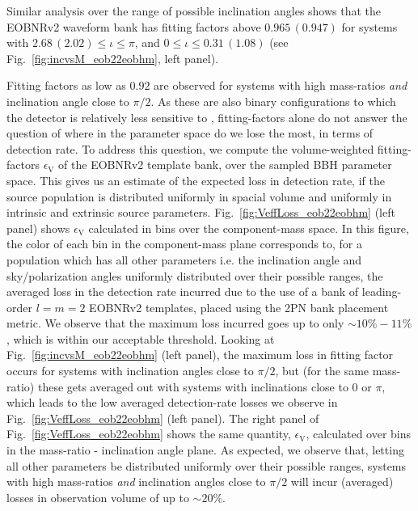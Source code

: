Similar analysis over the range of possible inclination angles shows that the EOBNRv2 
waveform bank has fitting factors above $0.965\, (0.947)$ for systems with
$2.68\,(2.02)\leq \iota \leq \pi$, and $0\leq \iota \leq 0.31\,(1.08)$ (see 
Fig.~\ref{fig:incvsM_eob22eobhm}, left panel). 


Fitting factors as low as $0.92$ are observed for systems with high mass-ratios 
\textit{and} inclination angle close to $\pi/2$. As these are also binary 
configurations to which the detector is relatively less sensitive to \citep{Pekowsky:2012sr}, 
fitting-factors alone do not answer the question of where in the parameter 
space do we lose the most, in terms of detection rate. To address
this question, we compute the volume-weighted fitting-factors $\epsilon_{\mathrm{V}}$
of the EOBNRv2
template bank, over the sampled BBH parameter space. This gives us an estimate of
the expected loss in detection rate, if the source population is distributed 
uniformly in spacial volume and uniformly in intrinsic and extrinsic source parameters. 
Fig.~\ref{fig:VeffLoss_eob22eobhm} (left panel) shows $\epsilon_{\mathrm{V}}$ 
calculated in bins over the
component-mass space. In this figure, the color of each bin in the component-mass 
plane corresponds to, for a population which has all other parameters i.e. the
inclination angle and sky/polarization angles uniformly distributed over their 
possible ranges, the averaged loss in the detection rate incurred due to the use 
of a bank of leading-order $l=m=2$ EOBNRv2 templates, placed using the 2PN bank 
placement metric. We observe that
the maximum loss incurred goes up to only $\sim 10\% - 11\%$, which is within our
acceptable threshold. Looking at Fig.~\ref{fig:incvsM_eob22eobhm} (left panel), 
the maximum loss in fitting factor occurs for systems with inclination angles 
close to $\pi/2$, but (for the same mass-ratio) these
gets averaged out with systems with inclinations close to $0$ or $\pi$, which
leads to the low averaged detection-rate losses we observe in 
Fig.~\ref{fig:VeffLoss_eob22eobhm} (left panel). The right panel of 
Fig.~\ref{fig:VeffLoss_eob22eobhm} shows the same quantity, $\epsilon_{\mathrm{V}}$,
calculated over bins in the mass-ratio - inclination angle plane. As expected, 
we observe that, letting all other parameters be distributed uniformly over their
possible ranges, systems with high mass-ratios \textit{and} inclination angles 
close to $\pi/2$ will incur (averaged) losses in observation volume of 
up to $\sim 20\%$.

